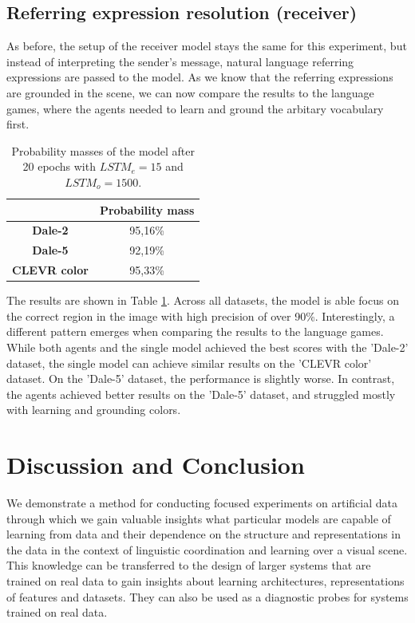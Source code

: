 \documentclass[11pt,a4paper]{article}
\begin{document}
\subsection{Referring expression resolution (receiver)}
As before, the setup of the receiver model stays the same for this experiment, but instead of interpreting the sender's message, natural language referring expressions are passed to the model.
As we know that the referring expressions are grounded in the scene, we can now compare the results to the language games, where the agents needed to learn and ground the arbitary vocabulary first.


\begin{table}[ht]
  \centering
  \begin{tabular}{c|c}
    \toprule
                         & \textbf{Probability mass} \\\midrule
    \textbf{Dale-2}      & {95,16\%}                 \\
    \textbf{Dale-5}      & {92,19\%}                 \\
    \textbf{CLEVR color} & {95,33\%}                 \\
    \bottomrule
  \end{tabular}
  \caption{Probability masses of the model after 20 epochs with $LSTM_e=15$ and $LSTM_o=1500$.}
  \label{tab:results:attention-reference-resolver}
\end{table}

The results are shown in Table \ref{tab:results:attention-reference-resolver}.
Across all datasets, the model is able focus on the correct region in the image with high precision of over 90\%.
Interestingly, a different pattern emerges when comparing the results to the language games.
While both agents and the single model achieved the best scores with the 'Dale-2' dataset, the single model can achieve similar results on the 'CLEVR color' dataset.
On the 'Dale-5' dataset, the performance is slightly worse.
In contrast, the agents achieved better results on the 'Dale-5' dataset, and struggled mostly with learning and grounding colors.

\section{Discussion and Conclusion}
We demonstrate a method for conducting focused experiments on artificial data through which we gain valuable insights what particular models are capable of learning from data and their dependence on the structure and representations in the data in the context of linguistic coordination and learning over a visual scene.
This knowledge can be transferred to the design of larger systems that are trained on real data to gain insights about learning architectures, representations of features and datasets.
They can also be used as a diagnostic probes for systems trained on real data.
\end{document}
